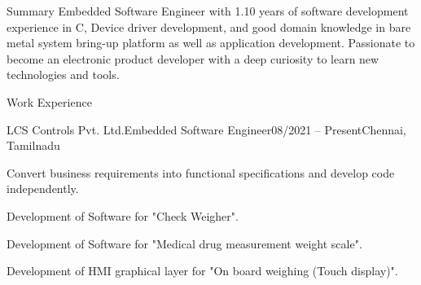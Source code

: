 \documentclass[]{Vetri-Resume}
\begin{document}
\resumeheader
{}
{}
{}
{}
{\address{Perungudi, Chennai}}
{}

\begin{section}{Summary}
{Embedded Software Engineer with 1.10 years of software development experience in C, Device driver development, and good domain knowledge in bare metal system bring-up platform as well as application development. Passionate to become an electronic product developer with a deep curiosity to learn new technologies and tools.}
\end{section}

\begin{section}{Work Experience}
    \begin{subsection}{LCS Controls Pvt. Ltd.}{Embedded Software Engineer}{08/2021 – Present}{Chennai, Tamilnadu}
        \item Convert business requirements into functional specifications and develop code independently.
         \item Development of Software for "Check Weigher".
        \item Development of Software for "Medical drug measurement weight scale".
        \item  Development of HMI graphical layer for "On board weighing (Touch display)".
    \end{subsection}
\end{section}

\end{document}
